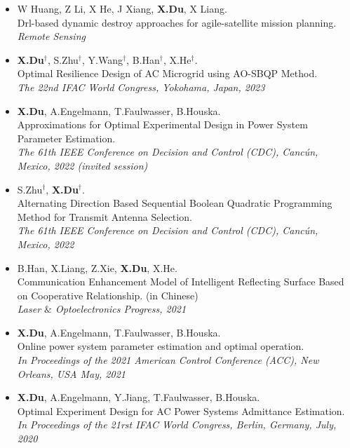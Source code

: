 \documentclass[paper=a4,fontsize=11pt]{scrartcl} %
\begin{document}
\begin{itemize}
	\item  {W Huang, Z Li, X He, J Xiang, \textbf{X.Du}, X Liang. \\
	{Drl-based dynamic destroy approaches for agile-satellite mission planning.}\\
	\emph{Remote Sensing\\
} }

	
		\item  {\textbf{X.Du}$^{\dag}$, S.Zhu$^{\dag}$, Y.Wang$^{\dag}$, B.Han$^{\dag}$, X.He$^{\dag}$. \\
		{Optimal Resilience Design of AC Microgrid using AO-SBQP Method.}\\
		\emph{The 22nd IFAC World Congress, Yokohama, Japan, 2023
	} }
	
		\item  { \textbf{X.Du}, A.Engelmann, T.Faulwasser, B.Houska. \\
		{Approximations for Optimal Experimental Design
			in Power System Parameter Estimation. }\\
		\emph{ The 61th IEEE Conference on Decision and Control (CDC), Canc\'un, Mexico, 2022 (invited session)
		} }
	
	
	\item  { S.Zhu$^{\dag}$, \textbf{X.Du}$^{\dag}$. \\
		{Alternating Direction Based Sequential Boolean Quadratic Programming Method for Transmit Antenna Selection.}\\
		\emph{ The 61th IEEE Conference on Decision and Control (CDC), Canc\'un, Mexico, 2022
	} }
	
		\item  { B.Han, X.Liang, Z.Xie, \textbf{X.Du}, X.He. \\
		{Communication Enhancement Model of Intelligent Reflecting Surface Based on Cooperative Relationship. (in Chinese)}\\
		\emph{Laser $\&$ Optoelectronics Progress, 2021
	} }
	
	\item  { \textbf{X.Du}, A.Engelmann, T.Faulwasser, B.Houska. \\
		{Online power system parameter estimation and optimal operation.}\\
		\emph{In Proceedings of the 2021 American Control Conference (ACC), New Orleans, USA May, 2021
	} }
	
		\item  {\textbf{X.Du}, A.Engelmann, Y.Jiang, T.Faulwasser, B.Houska. \\
		Optimal Experiment Design for AC Power Systems Admittance Estimation.\\
		\emph{In Proceedings of the 21rst IFAC World Congress, Berlin, Germany, July, 2020
		} }
	

\end{itemize}
\end{document}

